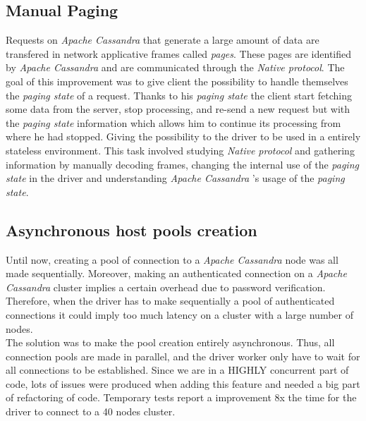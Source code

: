 \documentclass[a4paper]{report}
\newcommand{\ca}{\emph{Apache Cassandra }}
\begin{document}
\subsection{Manual Paging}
Requests on \ca that generate a large amount of data are transfered in network applicative frames called \emph{pages}. These pages are identified by \ca and are communicated through the \emph{Native protocol}. The goal of this improvement was to give client the possibility to handle themselves the \emph{paging state} of a request. Thanks to his \emph{paging state} the client start fetching some data from the server, stop processing, and re-send a new request but with the \emph{paging state} information which allows him to continue its processing from where he had stopped. Giving the possibility to the driver to be used in a entirely stateless environment. This task involved studying \emph{Native protocol} and gathering information by manually decoding frames, changing the internal use of the \emph{paging state} in the driver and understanding \ca's usage of the \emph{paging state}.
\subsection{Asynchronous host pools creation} %
\label{sub:asynchronous_host_pools_creation}

Until now, creating a pool of connection to a \ca node was all made sequentially. Moreover, making an authenticated connection on a \ca cluster implies a certain overhead due to password verification. Therefore, when the driver has to make sequentially a pool of authenticated connections it could imply too much latency on a cluster with a large number of nodes.\\
The solution was to make the pool creation entirely asynchronous. Thus, all connection pools are made in parallel, and the driver worker only have to wait for all connections to be established. Since we are in a HIGHLY concurrent part of code, lots of issues were produced when adding this feature and needed a big part of refactoring of code. Temporary tests report a improvement 8x the time for the driver to connect to a 40 nodes cluster.
\end{document}
